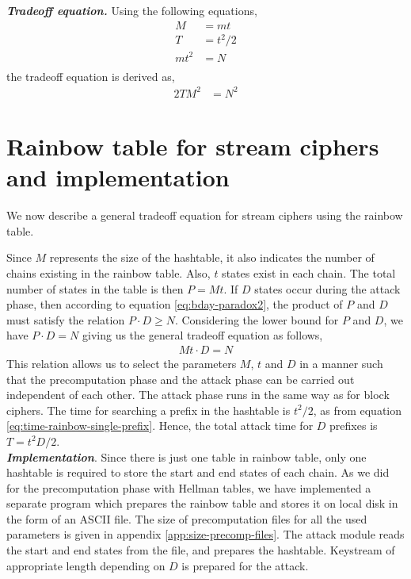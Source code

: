 \noindent \textit{\textbf{Tradeoff equation.}} Using the following equations,
\begin{align*}
M &= mt\\
T &= t^2/2\\
mt^2 &= N\\
\end{align*}
the tradeoff equation is derived as,
\begin{align}
\label{eq:tmdto-rainbow-block} 2TM^2 &= N^2
\end{align}

\section{Rainbow table for stream ciphers and implementation}
\label{sec:rainbow-stream}

We now describe a general tradeoff equation for stream ciphers using the rainbow table.

Since $M$ represents the size of the hashtable, it also indicates the number of chains existing in the rainbow table. Also, $t$ states exist in each chain. The total number of states in the table is then $P = Mt$. If $D$ states occur during the attack phase, then according to equation \ref{eq:bday-paradox2}, the product of $P$ and $D$ must satisfy the relation $P \cdot D \geq N$. Considering the lower bound for $P$ and $D$, we have $P \cdot D = N$ giving us the general tradeoff equation as follows,
\begin{align}
\label{eq:general-rainbow-stream} Mt \cdot D = N
\end{align} 
This relation allows us to select the parameters $M$, $t$ and $D$ in a manner such that the precomputation phase and the attack phase can be carried out independent of each other. The attack phase runs in the same way as for block ciphers. The time for searching a prefix in the hashtable is $t^2/2$, as from equation \ref{eq:time-rainbow-single-prefix}. Hence, the total attack time for $D$ prefixes is $T = t^2D/2$.\\

\noindent \textbf{\textit{Implementation}}. Since there is just one table in rainbow table, only one hashtable is required to store the start and end states of each chain. As we did for the precomputation phase with Hellman tables, we have implemented a separate program which prepares the rainbow table and stores it on local disk in the form of an ASCII file. The size of precomputation files for all the used parameters is given in appendix \ref{app:size-precomp-files}. The attack module reads the start and end states from the file, and prepares the hashtable. Keystream of appropriate length depending on $D$ is prepared for the attack. 

